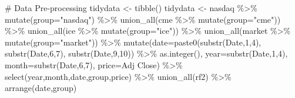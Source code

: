 \documentclass[
  letterpaper,
  DIV=11,
  numbers=noendperiod]{scrreprt}
\newenvironment{Shaded}{\begin{snugshade}}{\end{snugshade}}
\newcommand{\AttributeTok}[1]{\textcolor[rgb]{0.40,0.45,0.13}{#1}}
\newcommand{\CommentTok}[1]{\textcolor[rgb]{0.37,0.37,0.37}{#1}}
\newcommand{\DecValTok}[1]{\textcolor[rgb]{0.68,0.00,0.00}{#1}}
\newcommand{\FunctionTok}[1]{\textcolor[rgb]{0.28,0.35,0.67}{#1}}
\newcommand{\NormalTok}[1]{\textcolor[rgb]{0.00,0.23,0.31}{#1}}
\newcommand{\OtherTok}[1]{\textcolor[rgb]{0.00,0.23,0.31}{#1}}
\newcommand{\SpecialCharTok}[1]{\textcolor[rgb]{0.37,0.37,0.37}{#1}}
\newcommand{\StringTok}[1]{\textcolor[rgb]{0.13,0.47,0.30}{#1}}
\begin{document}
\begin{Shaded}
\begin{Highlighting}[]
\CommentTok{\# Data Pre{-}processing}
\NormalTok{tidydata }\OtherTok{\textless{}{-}} \FunctionTok{tibble}\NormalTok{()}
\NormalTok{tidydata }\OtherTok{\textless{}{-}}\NormalTok{ nasdaq }\SpecialCharTok{\%\textgreater{}\%} 
  \FunctionTok{mutate}\NormalTok{(}\AttributeTok{group=}\StringTok{"nasdaq"}\NormalTok{) }\SpecialCharTok{\%\textgreater{}\%} 
  \FunctionTok{union\_all}\NormalTok{(cme }\SpecialCharTok{\%\textgreater{}\%} \FunctionTok{mutate}\NormalTok{(}\AttributeTok{group=}\StringTok{"cme"}\NormalTok{)) }\SpecialCharTok{\%\textgreater{}\%} 
  \FunctionTok{union\_all}\NormalTok{(ice }\SpecialCharTok{\%\textgreater{}\%} \FunctionTok{mutate}\NormalTok{(}\AttributeTok{group=}\StringTok{"ice"}\NormalTok{)) }\SpecialCharTok{\%\textgreater{}\%} 
  \FunctionTok{union\_all}\NormalTok{(market }\SpecialCharTok{\%\textgreater{}\%} \FunctionTok{mutate}\NormalTok{(}\AttributeTok{group=}\StringTok{"market"}\NormalTok{)) }\SpecialCharTok{\%\textgreater{}\%} 
  \FunctionTok{mutate}\NormalTok{(}\AttributeTok{date=}\FunctionTok{paste0}\NormalTok{(}\FunctionTok{substr}\NormalTok{(Date,}\DecValTok{1}\NormalTok{,}\DecValTok{4}\NormalTok{),}
                     \FunctionTok{substr}\NormalTok{(Date,}\DecValTok{6}\NormalTok{,}\DecValTok{7}\NormalTok{),}
                     \FunctionTok{substr}\NormalTok{(Date,}\DecValTok{9}\NormalTok{,}\DecValTok{10}\NormalTok{)) }\SpecialCharTok{\%\textgreater{}\%} \FunctionTok{as.integer}\NormalTok{(),}
         \AttributeTok{year=}\FunctionTok{substr}\NormalTok{(Date,}\DecValTok{1}\NormalTok{,}\DecValTok{4}\NormalTok{),}
         \AttributeTok{month=}\FunctionTok{substr}\NormalTok{(Date,}\DecValTok{6}\NormalTok{,}\DecValTok{7}\NormalTok{),}
         \AttributeTok{price=}\StringTok{\textasciigrave{}}\AttributeTok{Adj Close}\StringTok{\textasciigrave{}}\NormalTok{) }\SpecialCharTok{\%\textgreater{}\%} 
  \FunctionTok{select}\NormalTok{(year,month,date,group,price) }\SpecialCharTok{\%\textgreater{}\%} 
  \FunctionTok{union\_all}\NormalTok{(rf2) }\SpecialCharTok{\%\textgreater{}\%} 
  \FunctionTok{arrange}\NormalTok{(date,group)}


\end{Highlighting}
\end{Shaded}
\end{document}
